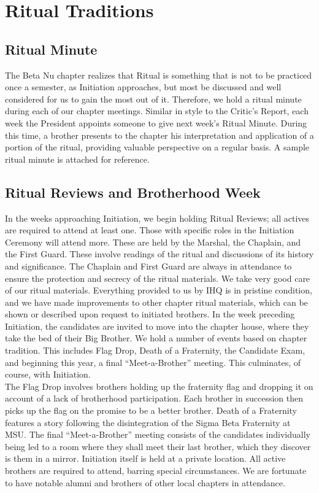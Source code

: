   \section*{Ritual Traditions}
   \subsection*{Ritual Minute}
      The Beta Nu chapter realizes that Ritual is something that is not to be practiced once a semester, as Initiation approaches, but most be discussed and well considered for us to gain the most out of it. Therefore, we hold a ritual minute during each of our chapter meetings. Similar in style to the Critic’s Report, each week the President appoints someone to give next week’s Ritual Minute. During this time, a brother presents to the chapter his interpretation and application of a portion of the ritual, providing valuable perspective on a regular basis. A sample ritual minute is attached for reference. \\
    
    \subsection*{Ritual Reviews and Brotherhood Week}
      In the weeks approaching Initiation, we begin holding Ritual Reviews; all actives are required to
attend at least one. Those with specific roles in the Initiation Ceremony will attend more. These are held by the Marshal, the Chaplain, and the First Guard. These involve readings of the ritual and discussions of its history and significance. The Chaplain and First Guard are always in attendance to ensure the protection and secrecy of the ritual materials. We take very good care of our ritual materials. Everything provided to us by IHQ is in pristine condition, and we have made improvements to other chapter ritual materials, which can be shown or described upon request to initiated brothers. In the week preceding Initiation, the candidates are invited to move into the chapter house, where they take the bed of their Big Brother. We hold a number of events based on chapter tradition. This includes Flag Drop, Death of a Fraternity, the Candidate Exam, and beginning this year, a final “Meet-a-Brother” meeting. This culminates, of course, with Initiation. \\

	The Flag Drop involves brothers holding up the fraternity flag and dropping it on account of a lack of brotherhood participation. Each brother in succession then picks up the flag on the promise to be a better brother. Death of a Fraternity features a story following the disintegration of the Sigma Beta Fraternity at MSU. The final ``Meet-a-Brother'' meeting consists of the candidates individually being led to a room where they shall meet their last brother, which they discover is them in a mirror. Initiation itself is held at a private location. All active brothers are required to attend, barring special circumstances. We are fortunate to have notable alumni and brothers of other local chapters in attendance.\\
      
